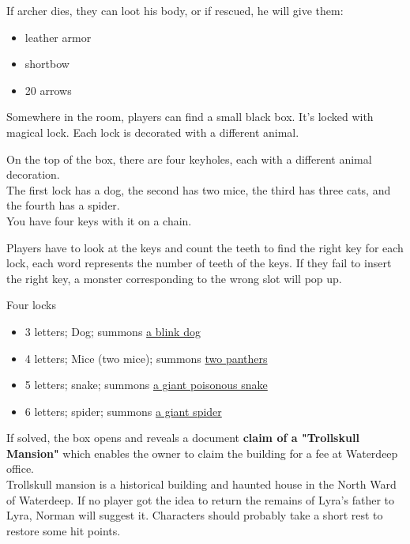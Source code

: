 \documentclass[10pt,onecolumn,twoside,openany,bg=full,layout=true]{dndbook}
\begin{document}
If archer dies, they can loot his body, or if rescued, he will give them:
\begin{itemize}
  \item leather armor
  \item shortbow
  \item 20 arrows
\end{itemize}
Somewhere in the room, players can find a small black box.
It's locked with magical lock.
Each lock is decorated with a different animal.
\begin{DndReadAloud}
On the top of the box, there are four keyholes, each with a different animal decoration.\\
The first lock has a dog, the second has two mice, the third has three cats, and the fourth has a spider.\\
You have four keys with it on a chain.
\end{DndReadAloud}
Players have to look at the keys and count the teeth to find the right key for each lock, each word represents the
number of teeth of the keys.
If they fail to insert the right key, a monster corresponding to the wrong slot will pop up.

Four locks
\begin{itemize}
\item 3 letters; Dog; summons \href{https://www.dndbeyond.com/monsters/16809-blink-dog}{a blink dog}
\item 4 letters; Mice (two mice); summons \href{https://www.dndbeyond.com/monsters/16976-panther}{two panthers}
\item 5 letters; snake; summons \href{https://www.dndbeyond.com/monsters/16890-giant-poisonous-snake}{a giant poisonous snake}
\item 6 letters; spider; summons \href{https://www.dndbeyond.com/monsters/16895-giant-spider}{a giant spider}
\end{itemize}

If solved, the box opens and reveals a document \textbf{claim of a "Trollskull Mansion"} which enables the owner to
claim the building for a fee at Waterdeep office.\\
Trollskull mansion is a historical building and haunted house in the North Ward of Waterdeep.
If no player got the idea to return the remains of Lyra's father to Lyra, Norman will suggest it.
Characters should probably take a short rest to restore some hit points.
\end{document}
